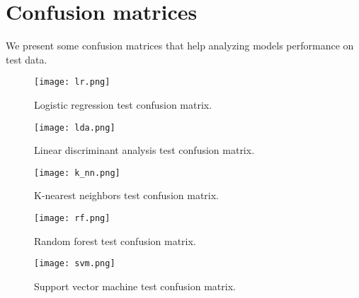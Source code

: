 \section{Confusion matrices}
    \label{sec:confusion_matrices}

    We present some confusion matrices that help analyzing models performance on test data.

    \begin{figure}[H]
            \texttt{[image: lr.png]}
            \caption{Logistic regression test confusion matrix.}
            \label{fig:lr}
    \end{figure}

    \begin{figure}[H]
            \texttt{[image: lda.png]}
            \caption{Linear discriminant analysis test confusion matrix.}
            \label{fig:lda}
    \end{figure}

    \begin{figure}[H]
            \texttt{[image: k\_nn.png]}
            \caption{K-nearest neighbors test confusion matrix.}
            \label{fig:k_nn}
    \end{figure}

    \begin{figure}[H]
            \texttt{[image: rf.png]}
            \caption{Random forest test confusion matrix.}
            \label{fig:rf}
    \end{figure}

    \begin{figure}[H]
            \texttt{[image: svm.png]}
            \caption{Support vector machine test confusion matrix.}
            \label{fig:svm}
    \end{figure}

